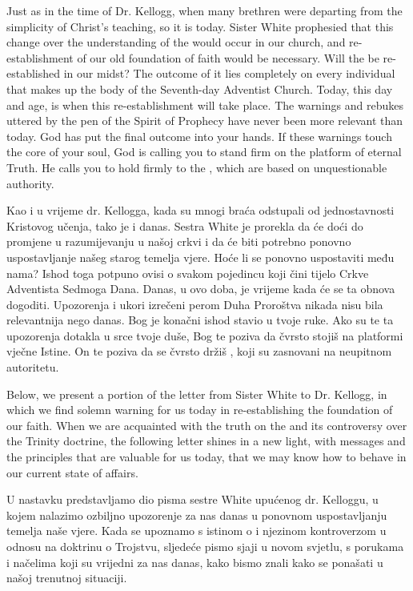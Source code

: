 Just as in the time of Dr. Kellogg, when many brethren were departing from the simplicity of Christ’s teaching, so it is today. Sister White prophesied that this change over the understanding of the  would occur in our church, and re-establishment of our old foundation of faith would be necessary. Will the  be re-established in our midst? The outcome of it lies completely on every individual that makes up the body of the Seventh-day Adventist Church. Today, this day and age, is when this re-establishment will take place. The warnings and rebukes uttered by the pen of the Spirit of Prophecy have never been more relevant than today. God has put the final outcome into your hands. If these warnings touch the core of your soul, God is calling you to stand firm on the platform of eternal Truth. He calls you to hold firmly to the , which are based on unquestionable authority.


Kao i u vrijeme dr. Kellogga, kada su mnogi braća odstupali od jednostavnosti Kristovog učenja, tako je i danas. Sestra White je prorekla da će doći do promjene u razumijevanju  u našoj crkvi i da će biti potrebno ponovno uspostavljanje našeg starog temelja vjere. Hoće li se  ponovno uspostaviti među nama? Ishod toga potpuno ovisi o svakom pojedincu koji čini tijelo Crkve Adventista Sedmoga Dana. Danas, u ovo doba, je vrijeme kada će se ta obnova dogoditi. Upozorenja i ukori izrečeni perom Duha Proroštva nikada nisu bila relevantnija nego danas. Bog je konačni ishod stavio u tvoje ruke. Ako su te ta upozorenja dotakla u srce tvoje duše, Bog te poziva da čvrsto stojiš na platformi vječne Istine. On te poziva da se čvrsto držiš , koji su zasnovani na neupitnom autoritetu.


Below, we present a portion of the letter from Sister White to Dr. Kellogg, in which we find solemn warning for us today in re-establishing the foundation of our faith. When we are acquainted with the truth on the  and its controversy over the Trinity doctrine, the following letter shines in a new light, with messages and the principles that are valuable for us today, that we may know how to behave in our current state of affairs.


U nastavku predstavljamo dio pisma sestre White upućenog dr. Kelloggu, u kojem nalazimo ozbiljno upozorenje za nas danas u ponovnom uspostavljanju temelja naše vjere. Kada se upoznamo s istinom o  i njezinom kontroverzom u odnosu na doktrinu o Trojstvu, sljedeće pismo sjaji u novom svjetlu, s porukama i načelima koji su vrijedni za nas danas, kako bismo znali kako se ponašati u našoj trenutnoj situaciji.


